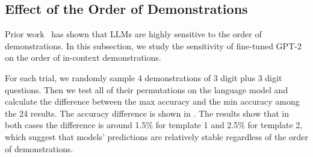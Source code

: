 

\subsection{Effect of the Order of Demonstrations}
Prior work~\cite{order} has shown that LLMs are highly sensitive to the order of demonstrations. 
In this subsection, we study the sensitivity of fine-tuned GPT-2 on the order of in-context demonstrations.

For each trial, we randomly sample 4 demonstrations of 3 digit plus 3 digit questions. Then we test all of their permutations on the language model and calculate the difference between the max accuracy and the min accuracy among the 24 results. The accuracy difference is shown in . The results show that in both cases the difference is around 1.5\% for template 1 and 2.5\% for template 2, which suggest that models' predictions are relatively stable regardless of the order of demonstrations.



